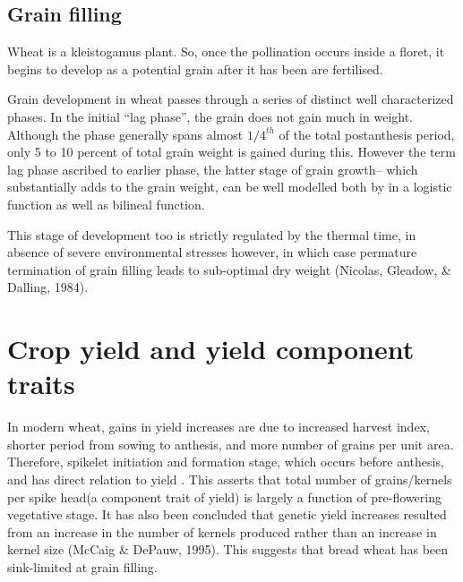 \documentclass[12pt,oneside]{dukestatscithesis} %
\begin{document}
\hypertarget{grain-filling}{%
\subsection{Grain filling}\label{grain-filling}}

Wheat is a kleistogamus plant. So, once the pollination occurs inside a floret, it begins to develop as a potential grain after it has been are fertilised.

Grain development in wheat passes through a series of distinct well characterized phases. In the initial ``lag phase'', the grain does not gain much in weight. Although the phase generally spans almost \(1/4^{th}\) of the total postanthesis period, only 5 to 10 percent of total grain weight is gained during this. However the term lag phase ascribed to earlier phase, the latter stage of grain growth-- which substantially adds to the grain weight, can be well modelled both by in a logistic function as well as bilineal function.

This stage of development too is strictly regulated by the thermal time, in absence of severe environmental stresses however, in which case permature termination of grain filling leads to sub-optimal dry weight (Nicolas, Gleadow, \& Dalling, 1984).

\hypertarget{crop-yield-and-yield-component-traits}{%
\section{Crop yield and yield component traits}\label{crop-yield-and-yield-component-traits}}

In modern wheat, gains in yield increases are due to increased harvest index, shorter period from sowing to anthesis, and more number of grains per unit area. Therefore, spikelet initiation and formation stage, which occurs before anthesis, and has direct relation to yield . This asserts that total number of grains/kernels per spike head(a component trait of yield) is largely a function of pre-flowering vegetative stage. It has also been concluded that genetic yield increases resulted from an increase in the number of kernels produced rather than an increase in kernel size (McCaig \& DePauw, 1995). This suggests that bread wheat has been sink-limited at grain filling.
\end{document}

